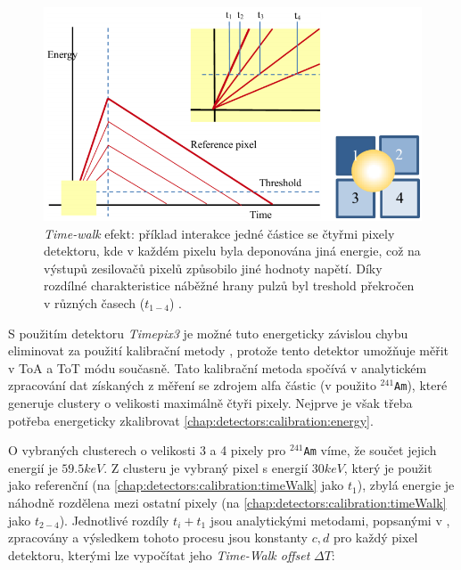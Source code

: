 \begin{figure}
	\begin{center}
		\includegraphics[width=12cm]{figures/calib_timeWalk.png}
		\caption{\textit{Time-walk} efekt: příklad interakce jedné částice se čtyřmi pixely detektoru, kde v každém pixelu byla deponována jiná energie, což na výstupů zesilovačů pixelů způsobilo jiné hodnoty napětí. Díky rozdílné charakteristice náběžné hrany pulzů byl treshold překročen v různých časech ($t_{1-4}$) \cite{Turecek2016TimeWakl}.}
		\label{fig:det:calib:timeWalk}
	\end{center}
\end{figure}

S použitím detektoru \textit{Timepix3}\cite{timepix3} je možné tuto energeticky závislou chybu eliminovat za použití kalibrační metody \cite{Turecek2016TimeWakl}, protože tento detektor umožňuje měřit v ToA a ToT módu současně. Tato kalibrační metoda spočívá v analytickém zpracování dat získaných z měření se zdrojem alfa částic (v \cite{Turecek2016TimeWakl} použito $^{241}$\texttt{Am}), které generuje clustery o velikosti maximálně čtyři pixely. Nejprve je však třeba potřeba energeticky zkalibrovat \ref{chap:detectors:calibration:energy}. 

O vybraných clusterech o velikosti 3 a 4 pixely pro $^{241}$\texttt{Am} víme, že součet jejich energií je $59.5keV$. Z clusteru je vybraný pixel s energií $30keV$, který je použit jako referenční (na \ref{chap:detectors:calibration:timeWalk} jako $t_1$), zbylá energie je náhodně rozdělena mezi ostatní pixely (na \ref{chap:detectors:calibration:timeWalk} jako $t_{2-4}$). Jednotlivé rozdíly $t_i+t_1$ jsou analytickými metodami, popsanými v \cite{Turecek2016TimeWakl}, zpracovány a výsledkem tohoto procesu jsou konstanty $c,d$ pro každý pixel detektoru, kterými lze vypočítat jeho \textit{Time-Walk offset} $\Delta T$:

